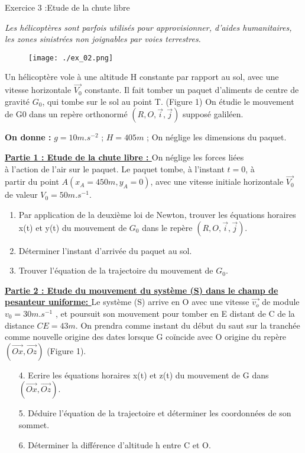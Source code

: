 \documentclass[12pt, french]{article}
\begin{document}
\begin{Box2}{Exercice 3 :Etude de la chute libre }

	\emph{Les hélicoptères sont parfois utilisés pour approvisionner, d’aides humanitaires, les
zones sinistrées non joignables par voies terrestres.}

	\begin{wrapfigure}[7]{r}{0.32\textwidth}
  \begin{center}

	  \vspace{-1.7cm}
	\texttt{[image: ./ex\_02.png]}
  \end{center}
\end{wrapfigure}
Un hélicoptère vole à une altitude H
constante par rapport au sol, avec une
vitesse horizontale $\vec{V_0}$ constante. Il
fait tomber un paquet d’aliments de
centre de gravité $G_0$, qui tombe sur le
sol au point T. (Figure 1)
On étudie le mouvement de G0 dans
un
repère
orthonormé $(R,O,\vec{i}, \vec{j})$
supposé galiléen.

\textbf{On donne :} $g = 10 m.s^{-2}$  ;  $H=405m$ ; On néglige les dimensions du paquet.

\textbf{\underline{Partie 1 : Etude de la chute libre : }}
On néglige les forces liées \\à l’action de l’air sur le paquet.
Le paquet tombe, à l’instant $t = 0$, à \\partir du point $A(x_A = 450 m, y_A = 0)$, avec une
vitesse initiale horizontale $\vec{V_0}$ de valeur $V_0 = 50 m.s^{-1}$.

\begin{enumerate}
	\item Par application de la deuxième loi de Newton, trouver les équations
		horaires x(t) et y(t) du mouvement de $G_0$ dans le repère $(R,O,\vec{i}, \vec{j})$.
	\item Déterminer l’instant d’arrivée du paquet au sol.
	\item  Trouver l’équation de la trajectoire du mouvement de $G_0$.
\end{enumerate}

\textbf{\underline{Partie 2 : Etude du mouvement du système (S) dans le champ de pesanteur uniforme: }}
Le système (S) arrive en O avec une vitesse $\vec{v_o}$ de module $v_0 =30 m.s^{ -1}$ , et poursuit son
mouvement pour tomber en E distant de C de la distance $CE = 43 m$.
On prendra comme instant du début du saut sur la tranchée comme nouvelle origine
des dates lorsque G coïncide avec O origine du repère $(\vec{Ox},\vec{Oz})$ (Figure 1).

\begin{enumerate}
	\item[4.]Ecrire les équations horaires x(t) et z(t) du mouvement de G dans $(\vec{Ox},\vec{Oz})$.
	\item[5.]  Déduire l’équation de la trajectoire et déterminer les coordonnées de son sommet.
	\item[6.] Déterminer la différence d’altitude h entre C et O.
\end{enumerate}

\end{Box2}
\end{document}
